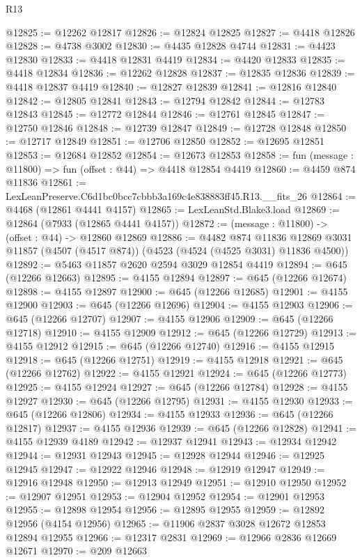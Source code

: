 \begin{lexlean}{R13}
\begin{coremodule}
@12825 := @12262 @12817
@12826 := @12824 @12825
@12827 := @4418 @12826
@12828 := @4738 @3002
@12830 := @4435 @12828 @4744
@12831 := @4423 @12830
@12833 := @4418 @12831 @4419
@12834 := @4420 @12833
@12835 := @4418 @12834
@12836 := @12262 @12828
@12837 := @12835 @12836
@12839 := @4418 @12837 @4419
@12840 := @12827 @12839
@12841 := @12816 @12840
@12842 := @12805 @12841
@12843 := @12794 @12842
@12844 := @12783 @12843
@12845 := @12772 @12844
@12846 := @12761 @12845
@12847 := @12750 @12846
@12848 := @12739 @12847
@12849 := @12728 @12848
@12850 := @12717 @12849
@12851 := @12706 @12850
@12852 := @12695 @12851
@12853 := @12684 @12852
@12854 := @12673 @12853
@12858 := fun (message : @11800) => fun (offset : @44) => @4418 @12854 @4419
@12860 := @4459 @874 @11836
@12861 := LexLeanPreserve.C6d1bc0bcc7cbbb3a169c4e838883ff45.R13.__fits_26
@12864 := @4468 (@12861 @4441 @4157)
@12865 := LexLeanStd.Blake3.load
@12869 := @12864 (@7933 (@12865 @4441 @4157))
@12872 := (message : @11800) -> (offset : @44) -> @12860 @12869
@12886 := @4482
    @874
    @11836
    @12869
    @3031
    @11857
    (@4507 (@4517 @874))
    (@4523 (@4524 (@4525 @3031) @11836 @4500))
@12892 := @5463 @11857 @2620 @2594 @3029 @12854 @4419
@12894 := @645 (@12266 @12663)
@12895 := @4155 @12894
@12897 := @645 (@12266 @12674)
@12898 := @4155 @12897
@12900 := @645 (@12266 @12685)
@12901 := @4155 @12900
@12903 := @645 (@12266 @12696)
@12904 := @4155 @12903
@12906 := @645 (@12266 @12707)
@12907 := @4155 @12906
@12909 := @645 (@12266 @12718)
@12910 := @4155 @12909
@12912 := @645 (@12266 @12729)
@12913 := @4155 @12912
@12915 := @645 (@12266 @12740)
@12916 := @4155 @12915
@12918 := @645 (@12266 @12751)
@12919 := @4155 @12918
@12921 := @645 (@12266 @12762)
@12922 := @4155 @12921
@12924 := @645 (@12266 @12773)
@12925 := @4155 @12924
@12927 := @645 (@12266 @12784)
@12928 := @4155 @12927
@12930 := @645 (@12266 @12795)
@12931 := @4155 @12930
@12933 := @645 (@12266 @12806)
@12934 := @4155 @12933
@12936 := @645 (@12266 @12817)
@12937 := @4155 @12936
@12939 := @645 (@12266 @12828)
@12941 := @4155 @12939 @4189
@12942 := @12937 @12941
@12943 := @12934 @12942
@12944 := @12931 @12943
@12945 := @12928 @12944
@12946 := @12925 @12945
@12947 := @12922 @12946
@12948 := @12919 @12947
@12949 := @12916 @12948
@12950 := @12913 @12949
@12951 := @12910 @12950
@12952 := @12907 @12951
@12953 := @12904 @12952
@12954 := @12901 @12953
@12955 := @12898 @12954
@12956 := @12895 @12955
@12959 := @12892 @12956 (@4154 @12956)
@12965 := @11906 @2837 @3028 @12672 @12853 @12894 @12955
@12966 := @12317 @2831
@12969 := @12966 @2836 @12669 @12671
@12970 := @209 @12663

\end{coremodule}
\end{lexlean}
